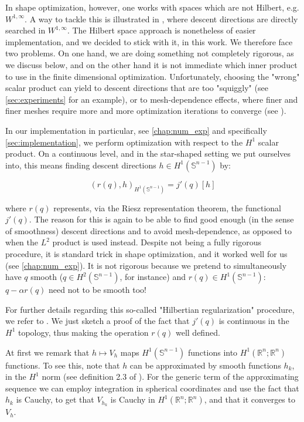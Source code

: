 \documentclass[english,a4paper,9pt,oneside]{scrbook}	%
\theoremstyle{break}
\theoremstyle{remark}
\newcommand{\mR}{\mathbb{R}}
\newcommand{\mS}{\mathbb{S}^{n-1}}
\begin{document}
In shape optimization, however, one works with spaces which are not Hilbert, e.g. $W^{1,\infty}$. A way to tackle this is illustrated in \cite{deckelnick}, where descent directions are directly searched in $W^{1,\infty}$. The Hilbert space approach is nonetheless of easier implementation, and we decided to stick with it, in this work. We therefore face two problems. On one hand, we are doing something not completely rigorous, as we discuss below, and on the other hand it is not immediate which inner product to use in the finite dimensional optimization. Unfortunately, choosing the "wrong" scalar product can yield to descent directions that are too "squiggly" (see \cref{sec:experiments} for an example), or to mesh-dependence effects, where finer and finer meshes require more and more optimization iterations to converge (see \cite{mesh_dependence}).

In our implementation in particular, see \cref{chap:num_exp} and specifically \cref{sec:implementation}, we perform optimization with respect to the $H^1$ scalar product. On a continuous level, and in the star-shaped setting we put ourselves into, this means finding descent directions $h \in H^1(\mS)$ by:

$$(r(q),h)_{H^1(\mS)}  = j'(q)[h]$$

where $r(q)$ represents, via the Riesz representation theorem, the functional $j'(q)$. The reason for this is again to be able to find good enough (in the sense of smoothness) descent directions and to avoid mesh-dependence, as opposed to when the $L^2$ product is used instead. Despite not being a fully rigorous procedure, it is standard trick in shape optimization, and it worked well for us (see  \cref{chap:num_exp}). It is not rigorous because we pretend to simultaneously have $q$ smooth ($q \in H^2(\mS)$, for instance) and $r(q) \in H^1(\mS)$: $q-\alpha r(q)$ need not to be smooth too!

For further details regarding this so-called "Hilbertian regularization" procedure, we refer to \cite{allaire}. We just sketch a proof of the fact that $j'(q)$ is continuous in the $H^1$ topology, thus making the operation $r(q)$ well defined.

At first we remark that $h\mapsto V_h$ maps $H^1(\mS)$ functions into $H^1(\mR^n;\mR^n)$ functions. To see this, note that $h$ can be approximated by smooth functions $h_k$, in the $H^1$ norm (see definition 2.3 of \cite{aubin}). For the generic term of the approximating sequence we can employ integration in spherical coordinates and use the fact that $h_k$ is Cauchy, to get that $V_{h_k}$ is Cauchy in $H^1(\mR^n;\mR^n)$, and that it converges to $V_h$. 
\end{document}

